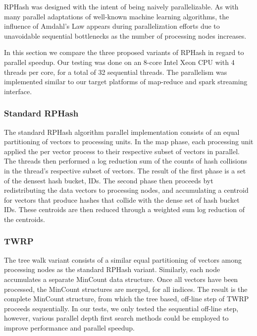 \textsf{RPHash} was designed with the intent of being naively parallelizable.  As with many parallel
adaptations of well-known machine learning algorithms, the influence of Amdahl's Law appears during
parallelization efforts due to unavoidable sequential bottlenecks as the number of processing nodes
increases.

In this section we compare the three proposed variants of \textsf{RPHash} in regard to parallel speedup.  Our
testing was done on an 8-core Intel Xeon CPU with 4 threads per core, for a total of 32 sequential
threads.  The parallelism was implemented similar to our target platforms of map-reduce and spark
streaming interface.

\subsubsection{Standard RPHash}

The standard \textsf{RPHash} algorithm parallel implementation consists of an equal partitioning of vectors
to processing units.  In the map phase, each processing unit applied the per vector process to their
respective subset of vectors in parallel.  The threads then performed a log reduction sum of the
counts of hash collisions in the thread's respective subset of vectors. The result of the first
phase is a set of the densest hash bucket, IDs.  The second phase then proceeds byt redistributing
the data vectors to processing nodes, and accumulating a centroid for vectors that produce hashes
that collide with the dense set of hash bucket IDs. These centroids are then reduced through a
weighted sum log reduction of the centroids.

\subsubsection{TWRP}

The tree walk variant consists of a similar equal partitioning of vectors among processing nodes as
the standard \textsf{RPHash} variant.  Similarly, each node accumulates a separate MinCount data
structure.  Once all vectors have been processed, the MinCount structures are merged, for all
indices.  The result is the complete MinCount structure, from which the tree based, off-line step of
\textsf{TWRP} proceeds sequentially. In our tests, we only tested the sequential off-line step, however,
various parallel depth first search methods could be employed to improve performance and parallel
speedup.

